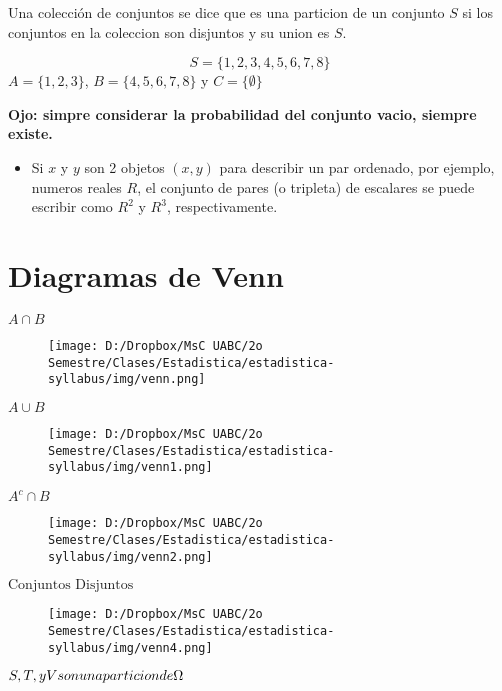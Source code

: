 \documentclass[]{book}
\providecommand{\tightlist}{%
  \setlength{\itemsep}{0pt}\setlength{\parskip}{0pt}}
\begin{document}
Una colección de conjuntos se dice que es una particion de un conjunto
\(S\) si los conjuntos en la coleccion son disjuntos y su union es
\(S\).

\[S = \{1,2,3,4,5,6,7,8\}\] \(A = \{1,2,3\}\), \(B = \{4,5,6,7,8\}\) y
\(C = \{\emptyset\}\)

 \textbf{Ojo: simpre considerar la probabilidad del conjunto vacio,
siempre existe.}

\begin{itemize}
\tightlist
\item
  Si \(x\) y \(y\) son 2 objetos \((x,y)\) para describir un par
  ordenado, por ejemplo, numeros reales \(R\), el conjunto de pares (o
  tripleta) de escalares se puede escribir como \(R^2\) y \(R^3\),
  respectivamente.
\end{itemize}

\section{\texorpdfstring{\textbf{Diagramas de
Venn}}{Diagramas de Venn}}\label{diagramas-de-venn-1}

 \(A \cap B\)

\begin{figure}[htbp]
\centering
\texttt{[image: D:/Dropbox/MsC UABC/2o Semestre/Clases/Estadistica/estadistica-syllabus/img/venn.png]}
\caption{}
\end{figure}

\(A\cup B\)

\begin{figure}[htbp]
\centering
\texttt{[image: D:/Dropbox/MsC UABC/2o Semestre/Clases/Estadistica/estadistica-syllabus/img/venn1.png]}
\caption{}
\end{figure}

\(A^c \cap B\)

\begin{figure}[htbp]
\centering
\texttt{[image: D:/Dropbox/MsC UABC/2o Semestre/Clases/Estadistica/estadistica-syllabus/img/venn2.png]}
\caption{}
\end{figure}

\(\text{Conjuntos Disjuntos}\)

\begin{figure}[htbp]
\centering
\texttt{[image: D:/Dropbox/MsC UABC/2o Semestre/Clases/Estadistica/estadistica-syllabus/img/venn4.png]}
\caption{}
\end{figure}

\(S,T,\space y \space V \space son \space una \space particion \space de \space \Omega\)
\end{document}
